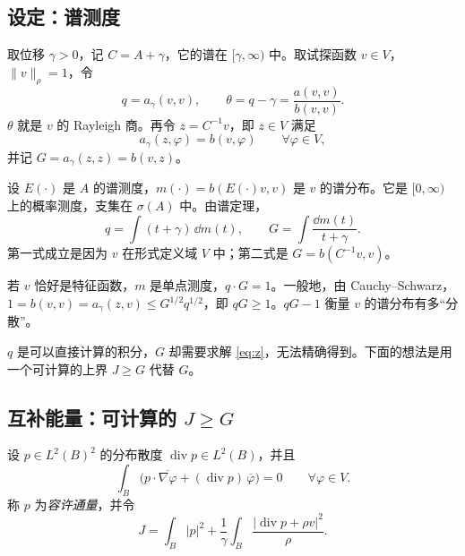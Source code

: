 \documentclass[11pt,a4paper,fontset=fandol]{ctexart}
\begin{document}
\subsection{设定：谱测度}

取位移 $\gamma>0$，记 $C=A+\gamma$，它的谱在 $[\gamma,\infty)$ 中。取试探函数 $v\in V$，$\|v\|_\rho=1$，令
\[
q=a_\gamma(v,v),\qquad \theta=q-\gamma=\frac{a(v,v)}{b(v,v)} .
\]
$\theta$ 就是 $v$ 的 Rayleigh 商。再令 $z=C^{-1}v$，即 $z\in V$ 满足
\begin{equation}
\label{eq:z}
a_\gamma(z,\varphi)=b(v,\varphi)\qquad\forall\varphi\in V ,
\end{equation}
并记 $G=a_\gamma(z,z)=b(v,z)$。

设 $E(\cdot)$ 是 $A$ 的谱测度，$m(\cdot)=b(E(\cdot)v,v)$ 是 $v$ 的谱分布。它是 $[0,\infty)$ 上的概率测度，支集在 $\sigma(A)$ 中。由谱定理，
\begin{equation}
\label{eq:qG-spectral}
q=\int(t+\gamma)\,\dd m(t),\qquad G=\int\frac{\dd m(t)}{t+\gamma}.
\end{equation}
第一式成立是因为 $v$ 在形式定义域 $V$ 中；第二式是 $G=b(C^{-1}v,v)$。

\begin{remark}
若 $v$ 恰好是特征函数，$m$ 是单点测度，$q\cdot G=1$。一般地，由 Cauchy--Schwarz，$1=b(v,v)=a_\gamma(z,v)\le G^{1/2}q^{1/2}$，即 $qG\ge1$。$qG-1$ 衡量 $v$ 的谱分布有多“分散”。
\end{remark}

$q$ 是可以直接计算的积分，$G$ 却需要求解 \eqref{eq:z}，无法精确得到。下面的想法是用一个可计算的上界 $J\ge G$ 代替 $G$。

\subsection{互补能量：可计算的 $J\ge G$}

\begin{definition}[容许通量]
\label{def:admissible}
设 $p\in L^2(B)^2$ 的分布散度 $\operatorname{div}p\in L^2(B)$，并且
\begin{equation}
\label{eq:green-p}
\int_B\bigl(p\cdot\overline{\nabla\varphi}+(\operatorname{div}p)\,\overline\varphi\bigr)=0\qquad\forall\varphi\in V .
\end{equation}
称 $p$ 为\emph{容许通量}，并令
\begin{equation}
\label{eq:J}
J=\int_B|p|^2+\frac1\gamma\int_B\frac{|\operatorname{div}p+\rho v|^2}{\rho}.
\end{equation}
\end{definition}
\end{document}
